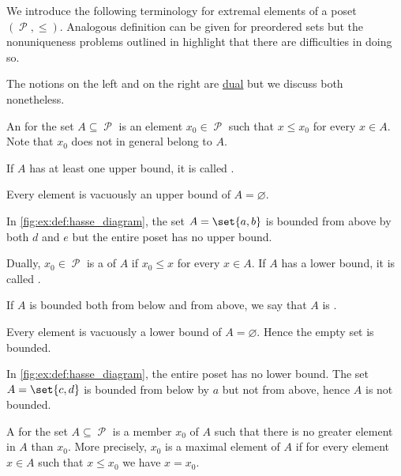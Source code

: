 \begin{definition}\label{def:poset_extremal_points}
  We introduce the following terminology for extremal elements of a poset \( (\mscrP, \leq) \). Analogous definition can be given for preordered sets but the nonuniqueness problems outlined in  highlight that there are difficulties in doing so.

  The notions on the left and on the right are \hyperref[def:poset/duality]{dual} but we discuss both nonetheless.

  \begin{thmenum}
    \begin{minipage}[t]{0.45\textwidth}
      An  for the set \( A \subseteq \mscrP \) is an element \( x_0 \in \mscrP \) such that \( x \leq x_0 \) for every \( x \in A \). Note that \( x_0 \) does not in general belong to \( A \).

      If \( A \) has at least one upper bound, it is called .

      Every element is vacuously an upper bound of \( A = \varnothing \).

      In \cref{fig:ex:def:hasse_diagram}, the set \( A = \set{ a, b } \) is bounded from above by both \( d \) and \( e \) but the entire poset has no upper bound.
    \end{minipage}
    \hspace{0.02\textwidth}
    \begin{minipage}[t]{0.45\textwidth}
      Dually, \( x_0 \in \mscrP \) is a  of \( A \) if \( x_0 \leq x \) for every \( x \in A \). If \( A \) has a lower bound, it is called .

      If \( A \) is bounded both from below and from above, we say that \( A \) is .

      Every element is vacuously a lower bound of \( A = \varnothing \). Hence the empty set is bounded.

      In \cref{fig:ex:def:hasse_diagram}, the entire poset has no lower bound. The set \( A = \set{ c, d } \) is bounded from below by \( a \) but not from above, hence \( A \) is not bounded.
    \end{minipage}

    \begin{minipage}[t]{0.45\textwidth}
      A  for the set \( A \subseteq \mscrP \) is a member \( x_0 \) of \( A \) such that there is no greater element in \( A \) than \( x_0 \). More precisely, \( x_0 \) is a maximal element of \( A \) if for every element \( x \in A \) such that \( x \leq x_0 \) we have \( x = x_0 \).


\end{minipage}
\end{thmenum}
\end{definition}
